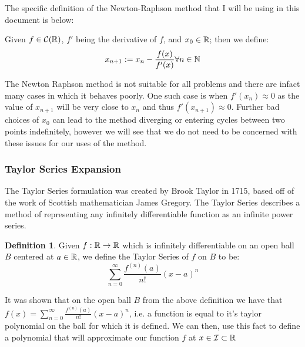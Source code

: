 The specific definition of the Newton-Raphson method that I will be using in this document is below:

\begin{Newton Method}
\label{DEF_"Newton-Raphson Method"}
Given \(f \in \mathcal{C}(\mathbb{R})\), \(f'\) being the derivative of \(f\), and \(x_0 \in \mathbb{R}\); then we define:
\begin{displaymath}
	x_{n+1} := x_n - \frac{f(x)}{f'(x)} \forall n \in \mathbb{N}
\end{displaymath}
\end{Newton Method}

The Newton Raphson method is not suitable for all problems and there are infact many cases in which it behaves poorly. One such case is when \(f'(x_n) \approx 0\) as the value of \(x_{n+1}\) will be very close to \(x_n\) and thus \(f'(x_{n+1}) \approx 0\). Further bad choices of \(x_0\) can lead to the method diverging or entering cycles between two points indefinitely, however we will see that we do not need to be concerned with these issues for our uses of the method.

\subsubsection{Taylor Series Expansion}
\label{SUBSUB_"Taylor Series"}
\theoremstyle{definition}
\newtheorem{Taylor Series}{Definition}[subsubsection]
\newtheorem{Taylor Polynomial}[Taylor Series]{Definition}

The Taylor Series formulation was created by Brook Taylor in 1715, based off of the work of Scottish mathematician James Gregory. The Taylor Series describes a method of representing any infinitely differentiable function as an infinite power series.

\begin{Taylor Series}
\label{DEF_"Taylor Series"}
Given \(f : \mathbb{R} \to \mathbb{R}\) which is infinitely differentiable on an open ball \(B\) centered at \(a \in \mathbb{R}\), we define the Taylor Series of \(f\) on \(B\) to be:
\[\sum_{n=0}^{\infty} \frac{f^{(n)}(a)}{n!}(x-a)^n\]
\end{Taylor Series}

It was shown that on the open ball \(B\) from the above definition we have that \(f(x) = \sum_{n=0}^{\infty} \frac{f^{(n)}(a)}{n!}(x-a)^n\), i.e. a function is equal to it's taylor polynomial on the ball for which it is defined. We can then, use this fact to define a polynomial that will approximate our function \(f\) at \(x \in \mathcal{I} \subset \mathbb{R}\)

